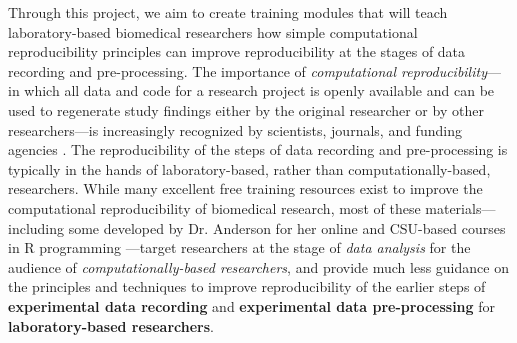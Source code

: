 \documentclass[pdftex,english,11pt,parskip=half]{scrartcl}
\begin{document}
Through this project, we aim to create training modules that will teach laboratory-based biomedical
researchers how simple computational reproducibility principles can improve
reproducibility at the stages of data recording and
pre-processing. The importance of \textit{computational reproducibility}---in which all
data and code for a research project is openly available and can be used to regenerate study findings either by the original researcher or by
other researchers---is increasingly recognized by scientists, journals, and funding
agencies \cite{ellis2018share, ram2013git}. The reproducibility of the steps of data recording and pre-processing is typically 
in the hands of laboratory-based, rather than computationally-based, researchers.
While many excellent free training resources exist to improve the computational
reproducibility of biomedical research, most of these
materials---including some developed by Dr. Anderson for her online and
CSU-based courses in R programming \cite{andersoncoursebook, andersonmastering}---target researchers at the stage of
\textit{data analysis} for the audience of \textit{computationally-based researchers}, and provide much less guidance on the principles and
techniques to improve reproducibility of the earlier steps of
\textbf{experimental data recording} and \textbf{experimental data
pre-processing} for \textbf{laboratory-based researchers}. 
\end{document}
